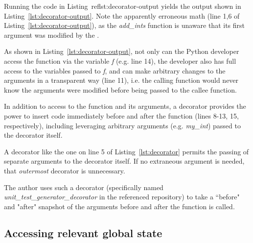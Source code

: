 

Running the code in Listing~ref{lst:decorator-output} yields the output shown in 
Listing~\ref{lst:decorator-output}. Note the apparently erroneous math (line 1,6 of 
Listing~\ref{lst:decorator-output}), as the \textit{add\_ints} function is 
unaware that its first argument was modified by the .

\lstset{style=batstyle}


\lstset{style=pythonstyle}

As shown in Listing~\ref{lst:decorator-output}, not only can the Python developer access the function
via the variable \textit{f} (e.g. line 14), the developer also has full
access to the variables passed to \textit{f}, and can make 
arbitrary changes to the arguments in a transparent way (line 11), 
i.e. the calling function would never know the arguments 
were modified before being passed to the callee function.

In addition to access to the function and its arguments,
a decorator provides the power to insert code immediately before and after 
the function (lines 8-13, 15, respectively), including leveraging arbitrary
arguments (e.g. \textit{my\_int}) passed to the decorator itself.

A decorator like the one on line 5 of Listing~\ref{lst:decorator} permits
the passing of separate arguments to the decorator itself.  
If no extraneous argument is needed, that \textit{outermost} decorator
is unnecessary.

The author uses such a decorator (specifically named 
\break
\textit{unit\_test\_generator\_decorator} in the referenced repository) to take
 a “before" and "after" snapshot of the arguments
before and after the function is called.

%
\subsection{Accessing relevant global state}\label{sec:approach-internal-2}

